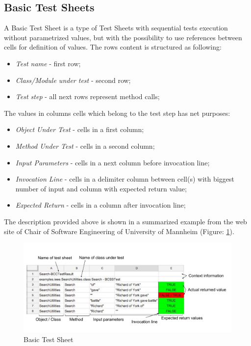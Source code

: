  \subsection{Basic Test Sheets}
A Basic Test Sheet is a type of Test Sheets with sequential tests execution without parametrized values, but with the possibility to use references between cells for definition of values.
The rows content is structured as following:
\begin{itemize}
	\item \textit{Test name} - first row;
	\item \textit{Class/Module under test} - second row;
	\item \textit{Test step} - all next rows represent method calls;
\end{itemize}

The values in columns cells which belong to the test step has net purposes:
\begin{itemize}
	\item \textit{Object Under Test} - cells in a first column;
	\item \textit{Method Under Test} - cells in a second column;
	\item \textit{Input Parameters} - cells in a next column before invocation line;
	\item \textit{Invocation Line} - cells in a delimiter column between cell(s) with biggest number of input and column with expected return value;
	\item \textit{Expected Return} - cells in a column after invocation line;
\end{itemize}

The description provided above is shown in a summarized example from the web site of Chair of Software Engineering of University of Mannheim (Figure: \ref{fig:BasictestSheet}).
  \begin{figure}[ht]
  	\label{fig:BasictestSheet}
    \centering
    \includegraphics[width=\textwidth]{grafiken/basic_test_sheet}
     \caption{Basic Test Sheet}
  \end{figure}



